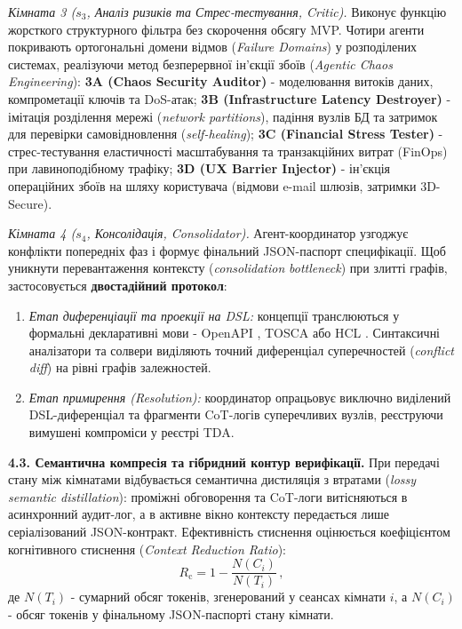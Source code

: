 \documentclass[12pt, reqno, a4paper]{amsart}
\theoremstyle{definition}
\theoremstyle{plain}
\theoremstyle{plain}
\theoremstyle{plain}
\theoremstyle{remark}
\theoremstyle{plain}
\begin{document}
{\textit{Кімната 3 ($s_3$, Аналіз ризиків та Стрес-тестування, Critic).} Виконує функцію жорсткого структурного фільтра без скорочення обсягу MVP. Чотири агенти покривають ортогональні домени відмов (\textit{Failure Domains}) у розподілених системах, реалізуючи метод безперервної ін'єкції збоїв (\textit{Agentic Chaos Engineering}): \textbf{3A (Chaos Security Auditor)} - моделювання витоків даних, компрометації ключів та DoS-атак; \textbf{3B (Infrastructure Latency Destroyer)} - імітація розділення мережі (\textit{network partitions}), падіння вузлів БД та затримок для перевірки самовідновлення (\textit{self-healing}); \textbf{3C (Financial Stress Tester)} - стрес-тестування еластичності масштабування та транзакційних витрат (FinOps) при лавиноподібному трафіку; \textbf{3D (UX Barrier Injector)} - ін'єкція операційних збоїв на шляху користувача (відмови e-mail шлюзів, затримки 3D-Secure).

{\sloppy\textit{Кімната 4 ($s_4$, Консолідація, Consolidator).} Агент-координатор узгоджує конфлікти попередніх фаз і формує фінальний JSON-паспорт специфікації. Щоб уникнути перевантаження контексту (\textit{consolidation} \textit{bottleneck}) при злитті графів, застосовується \textbf{двостадійний протокол}:\par}
\begin{enumerate}
\item \textit{Етап диференціації та проекції на DSL:} концепції транслюються у формальні декларативні мови - OpenAPI \cite{bib20}, TOSCA \cite{bib21} або HCL \cite{bib22}. Синтаксичні аналізатори та солвери виділяють точний диференціал суперечностей (\textit{conflict diff}) на рівні графів залежностей.
\item \textit{Етап примирення (Resolution):} координатор опрацьовує виключно виділений DSL-диференціал та фрагменти CoT-логів суперечливих вузлів, реєструючи вимушені компроміси у реєстрі TDA.
\end{enumerate}

\textbf{4.3. Семантична компресія та гібридний контур верифікації.} При передачі стану між кімнатами відбувається семантична дистиляція з втратами (\textit{lossy semantic distillation}): проміжні обговорення та CoT-логи витісняються в асинхронний аудит-лог, а в активне вікно контексту передається лише серіалізований JSON-контракт. Ефективність стиснення оцінюється коефіцієнтом когнітивного стиснення (\textit{Context Reduction Ratio}):
\begin{equation}
\label{eq:rc}
R_{\text{c}} = 1 - \frac{N(C_i)}{N(T_i)}\, ,
\end{equation}
де $N(T_i)$ - сумарний обсяг токенів, згенерований у сеансах кімнати $i$, а $N(C_i)$ - обсяг токенів у фінальному JSON-паспорті стану кімнати.

}
\end{document}
